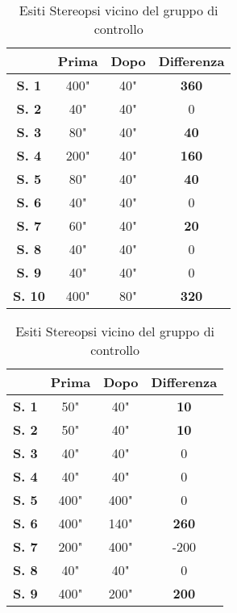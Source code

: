
\\\ \\\ \\\
\begin{table}[H]
\centering
\setlength\tabcolsep{4pt}
\begin{minipage}{0.48\textwidth}
\centering


\begin{tabular}{|c|c|c|c|} \hline
{\textbf{}} & {\textbf{Prima}} & {\textbf{Dopo}}& {\textbf{Differenza}} \\ \hline
\textbf{S. 1} & 400" & 40" & \textbf{360} \\ \hline
\textbf{S. 2} & 40" & 40" & 0 \\ \hline
\textbf{S. 3} & 80" & 40" & \textbf{40} \\ \hline
\textbf{S. 4} & 200" & 40" & \textbf{160} \\ \hline
\textbf{S. 5} & 80" & 40" & \textbf{40} \\ \hline
\textbf{S. 6} & 40" & 40" & 0 \\ \hline
\textbf{S. 7} & 60" & 40" & \textbf{20} \\ \hline
\textbf{S. 8} & 40" & 40" & 0 \\ \hline
\textbf{S. 9} & 40" & 40" & 0 \\ \hline
\textbf{S. 10} & 400" & 80" & \textbf{320} \\ \hline
\end{tabular} 
\caption{Esiti Stereopsi vicino del gruppo sperimentale}

\label{tab:accuracy} 
\end{minipage}%
\hfill
\begin{minipage}{0.48\textwidth}
\centering

\begin{tabular}{|c|c|c|c|} \hline
{\textbf{}} & {\textbf{Prima}} & {\textbf{Dopo}}& {\textbf{Differenza}} \\ \hline
\textbf{S. 1} & 50" & 40" & \textbf{10}\\ \hline
\textbf{S. 2} & 50" & 40" & \textbf{10} \\ \hline
\textbf{S. 3} & 40" & 40" & 0 \\ \hline
\textbf{S. 4} & 40" & 40" & 0 \\ \hline
\textbf{S. 5} & 400" & 400" & 0 \\ \hline
\textbf{S. 6} & 400" & 140" & \textbf{260} \\ \hline
\textbf{S. 7} & 200" & 400" & -200\\ \hline
\textbf{S. 8} & 40" & 40" & 0 \\ \hline
\textbf{S. 9} & 400" & 200" & \textbf{200} \\ \hline
\end{tabular} 
\caption{Esiti Stereopsi vicino del gruppo di controllo}

 \label{tab:ompdiff} 
\end{minipage}
\end{table}




